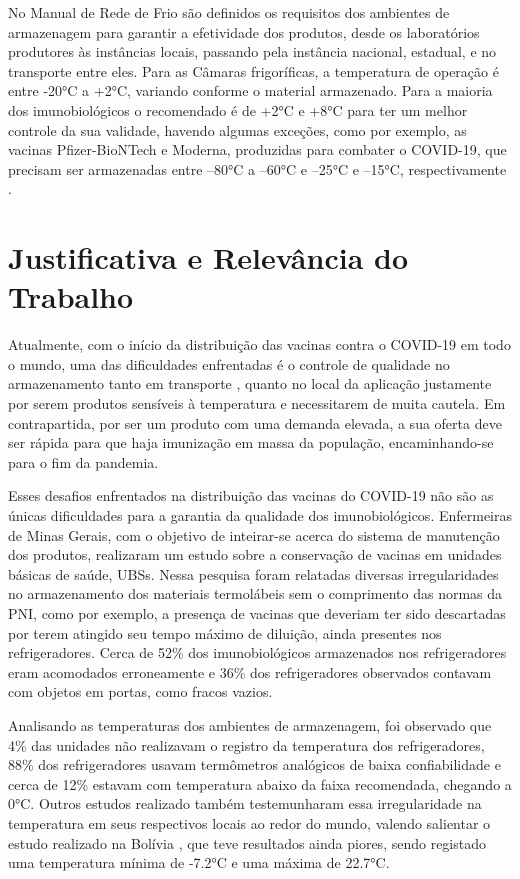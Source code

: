 No Manual de Rede de Frio \cite{ministerio2001manual} são definidos os requisitos dos ambientes de armazenagem para garantir a efetividade dos produtos, desde os laboratórios produtores às instâncias locais, passando pela instância nacional, estadual, e no transporte entre eles. Para as  Câmaras frigoríficas, a temperatura de operação é entre -20°C a +2°C, variando conforme o material armazenado. Para a maioria dos imunobiológicos o recomendado é de +2°C e +8°C para ter um melhor controle da sua validade, havendo algumas exceções, como por exemplo, as vacinas Pfizer-BioNTech e Moderna,  produzidas para combater o COVID-19, que precisam ser armazenadas entre –80°C a –60°C e –25°C e –15°C, respectivamente \cite{niforatoscommon}.

\section{Justificativa e Relevância do Trabalho}
\label{intro:justificativa}
Atualmente, com o início da distribuição das vacinas contra o COVID-19 em todo o mundo, uma das dificuldades enfrentadas é o controle de qualidade no armazenamento tanto em transporte \cite{baechallenges}, quanto no local da aplicação justamente por serem produtos sensíveis à temperatura e necessitarem de muita cautela. Em contrapartida, por ser um produto com uma demanda elevada, a sua oferta deve ser rápida para que haja imunização em massa da população, encaminhando-se para o fim da pandemia.

Esses desafios enfrentados na distribuição das vacinas do COVID-19 não são as únicas dificuldades para a garantia da qualidade dos imunobiológicos. Enfermeiras de Minas Gerais, com o objetivo de inteirar-se acerca do sistema de manutenção dos produtos, realizaram um estudo sobre a conservação de vacinas em unidades básicas de saúde, UBSs. Nessa pesquisa foram relatadas diversas irregularidades no armazenamento dos materiais termolábeis sem o comprimento das normas da PNI, como por exemplo, a presença de vacinas que deveriam ter sido descartadas por terem atingido seu tempo máximo de diluição, ainda presentes nos refrigeradores. Cerca de 52\% dos imunobiológicos armazenados nos refrigeradores eram acomodados erroneamente e 36\% dos refrigeradores observados contavam com objetos em portas, como fracos vazios.

Analisando as temperaturas dos ambientes de armazenagem, foi observado que 4\% das unidades não realizavam o registro da temperatura dos refrigeradores, 88\% dos refrigeradores usavam termômetros analógicos de baixa confiabilidade e cerca de 12\% estavam com temperatura abaixo da faixa recomendada, chegando a 0°C. Outros estudos realizado \cite{oliveira2014avaliaccao, nelson2007monitoring, falcon2020vaccine} também testemunharam essa irregularidade na temperatura em seus respectivos locais ao redor do mundo, valendo salientar o estudo realizado na Bolívia \cite{nelson2007monitoring}, que teve resultados ainda piores, sendo registado uma temperatura mínima de -7.2°C e uma máxima de 22.7°C.

